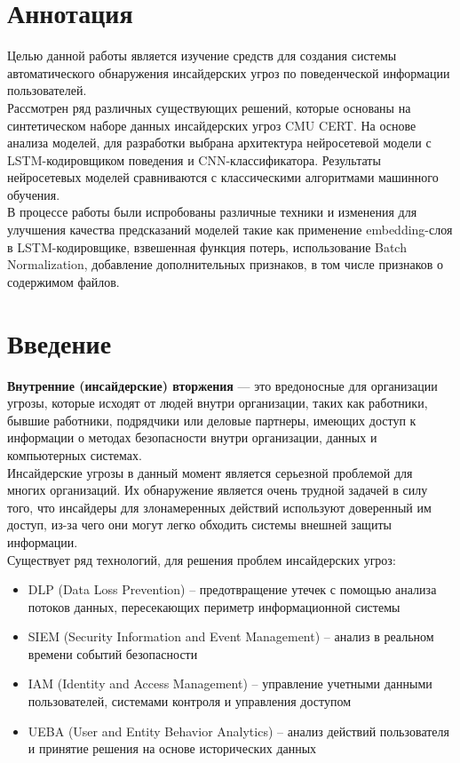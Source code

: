 
\chapter{Аннотация}

Целью данной работы является изучение средств для создания системы автоматического обнаружения инсайдерских угроз по поведенческой информации пользователей.\\
Рассмотрен ряд различных существующих решений, которые основаны на синтетическом наборе данных инсайдерских угроз CMU CERT. На основе анализа моделей, для разработки выбрана архитектура нейросетевой модели с LSTM-кодировщиком поведения и CNN-классификатора. Результаты нейросетевых моделей сравниваются с классическими алгоритмами машинного обучения.\\
В процессе работы были испробованы различные техники и изменения для улучшения качества предсказаний моделей такие как применение embedding-слоя в LSTM-кодировщике, взвешенная функция потерь, использование Batch Normalization, добавление дополнительных признаков, в том числе признаков о содержимом файлов.

\chapter{Введение}

\textbf{Внутренние (инсайдерские) вторжения} — это вредоносные для организации угрозы, которые исходят от людей внутри организации, таких как работники, бывшие работники, подрядчики или деловые партнеры, имеющих доступ к информации о методах безопасности внутри организации, данных и компьютерных системах.\\

Инсайдерские угрозы в данный момент является серьезной проблемой для многих организаций. Их обнаружение является очень трудной задачей в силу того, что инсайдеры для злонамеренных действий используют доверенный им доступ, из-за чего они могут легко обходить системы внешней защиты информации.\\

Существует ряд технологий, для решения проблем инсайдерских угроз:\\
\begin{itemize}
\item DLP (Data Loss Prevention) – предотвращение утечек с помощью анализа потоков данных, пересекающих периметр информационной системы\\
\item SIEM (Security Information and Event Management) – анализ в реальном времени событий безопасности\\
\item IAM (Identity and Access Management) – управление учетными данными пользователей, системами контроля и управления доступом\\
\item UEBA (User and Entity Behavior Analytics) – анализ действий пользователя и принятие решения на основе исторических данных\\
\end{itemize}

